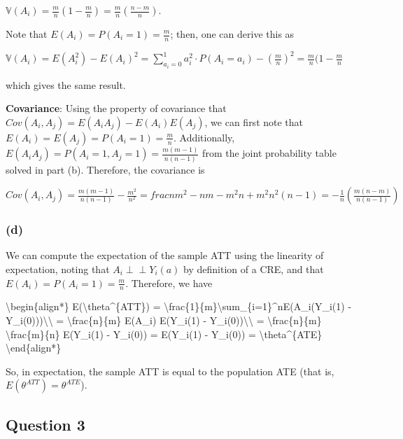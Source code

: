 \documentclass[
  11pt,
  letterpaper,
  DIV=11,
  numbers=noendperiod]{scrartcl}
\newenvironment{Shaded}{}{}
\newcommand{\NormalTok}[1]{\textcolor[rgb]{0.24,0.22,0.21}{#1}}
\begin{document}
\(\mathbb{V}(A_i) = \frac{m}{n}(1 - \frac{m}{n}) = \frac{m}{n}(\frac{n - m}{n})\).

Note that \(E(A_i) = P(A_i = 1) = \frac{m}{n}\); then, one can derive
this as

\(\mathbb{V}(A_i) = E(A_i^2) - E(A_i)^2 = \sum_{a_i = 0}^1 a_i^2\cdot P(A_i = a_i) - (\frac{m}{n})^2 = \frac{m}{n}(1 - \frac{m}{n}\)

which gives the same result.

\textbf{Covariance}: Using the property of covariance that
\(Cov(A_i, A_j) = E(A_iA_j) - E(A_i)E(A_j)\), we can first note that
\(E(A_i) = E(A_j) = P(A_i = 1) = \frac{m}{n}\). Additionally,
\(E(A_iA_j) = P(A_i = 1, A_j = 1) = \frac{m(m-1)}{n(n-1)}\) from the
joint probability table solved in part (b). Therefore, the covariance is

\(Cov(A_i, A_j) = \frac{m(m-1)}{n(n-1)} - \frac{m^2}{n^2} = frac{nm^2 - nm - m^2n + m^2}{n^2(n-1)} = -\frac{1}{n}(\frac{m(n-m)}{n(n-1)})\)

\hypertarget{d}{%
\subsubsection{(d)}\label{d}}

We can compute the expectation of the sample ATT using the linearity of
expectation, noting that \(A_i \perp\!\!\!\!\perp Y_i(a)\) by definition
of a CRE, and that \(E(A_i) = P(A_i = 1) = \frac{m}{n}\). Therefore, we
have

\begin{Shaded}
\begin{Highlighting}[]
\NormalTok{\textbackslash{}begin\{align*\}}
\NormalTok{E(\textbackslash{}theta\^{}\{ATT\}) = \textbackslash{}frac\{1\}\{m\}\textbackslash{}sum\_\{i=1\}\^{}nE(A\_i(Y\_i(1) {-} Y\_i(0)))\textbackslash{}\textbackslash{}}
\NormalTok{= \textbackslash{}frac\{n\}\{m\} E(A\_i) E(Y\_i(1) {-} Y\_i(0))\textbackslash{}\textbackslash{}}
\NormalTok{= \textbackslash{}frac\{n\}\{m\} \textbackslash{}frac\{m\}\{n\} E(Y\_i(1) {-} Y\_i(0))}
\NormalTok{= E(Y\_i(1) {-} Y\_i(0)) = \textbackslash{}theta\^{}\{ATE\}}
\NormalTok{\textbackslash{}end\{align*\}}
\end{Highlighting}
\end{Shaded}

So, in expectation, the sample ATT is equal to the population ATE (that
is, \(E(\theta^{ATT}) = \theta^{ATE}\)).

\newpage{}

\hypertarget{question-3}{%
\subsection{Question 3}\label{question-3}}
\end{document}
